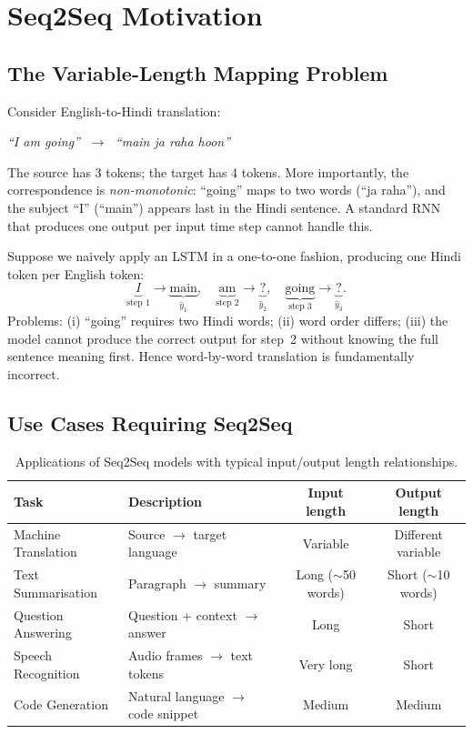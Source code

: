 \documentclass[12pt,a4paper]{article}
\begin{document}
\section{Seq2Seq Motivation}
\label{sec:motivation}

\subsection{The Variable-Length Mapping Problem}

Consider English-to-Hindi translation:
\begin{center}
  \textit{``I am going''} $\;\longrightarrow\;$ \textit{``main ja raha hoon''}
\end{center}
The source has 3 tokens; the target has 4 tokens. More importantly, the correspondence is
\emph{non-monotonic}: ``going'' maps to two words (``ja raha''), and the subject ``I'' (``main'')
appears last in the Hindi sentence. A standard RNN that produces one output per input time step
cannot handle this.

\begin{example}[title={Why word-by-word translation fails}]
  Suppose we naively apply an LSTM in a one-to-one fashion, producing one Hindi token per English
  token:
  \[
    \underbrace{I}_{\text{step 1}} \to \underbrace{\text{main}}_{\hat{y}_1}, \quad
    \underbrace{\text{am}}_{\text{step 2}} \to \underbrace{?}_{\hat{y}_2}, \quad
    \underbrace{\text{going}}_{\text{step 3}} \to \underbrace{?}_{\hat{y}_3}.
  \]
  Problems: (i) ``going'' requires two Hindi words; (ii) word order differs; (iii) the model cannot
  produce the correct output for step~2 without knowing the full sentence meaning first.
  Hence word-by-word translation is fundamentally incorrect.
\end{example}

\subsection{Use Cases Requiring Seq2Seq}

\begin{table}[htbp]
  \centering
  \caption{Applications of Seq2Seq models with typical input/output length relationships.}
  \label{tab:usecases}
  \begin{tabular}{@{}llcc@{}}
    \toprule
    \textbf{Task} & \textbf{Description} & \textbf{Input length} & \textbf{Output length} \\
    \midrule
    Machine Translation & Source $\to$ target language & Variable & Different variable \\
    Text Summarisation  & Paragraph $\to$ summary      & Long ($\sim$50 words) & Short ($\sim$10 words) \\
    Question Answering  & Question + context $\to$ answer & Long & Short \\
    Speech Recognition  & Audio frames $\to$ text tokens & Very long & Short \\
    Code Generation     & Natural language $\to$ code snippet & Medium & Medium \\
    \bottomrule
  \end{tabular}
\end{table}
\end{document}
